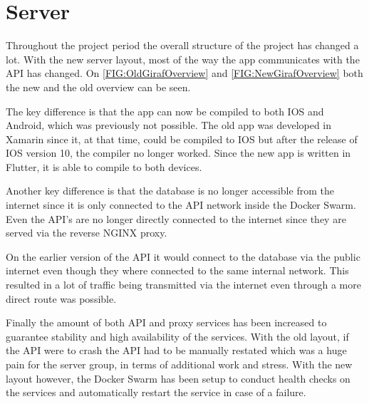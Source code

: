 \section{Server}

Throughout the project period the overall structure of the project has changed a lot. 
With the new server layout, most of the way the app communicates with the API has changed. 
On \autoref{FIG:OldGirafOverview} and \autoref{FIG:NewGirafOverview} both the new and the old overview can be seen. 

The key difference is that the app can now be compiled to both IOS and Android, which was previously not possible. 
The old app was developed in Xamarin since it, at that time, could be compiled to IOS but after the release of IOS version 10, the compiler no longer worked. 
Since the new app is written in Flutter, it is able to compile to both devices. 


Another key difference is that the database is no longer accessible from the internet since it is only connected to the API network inside the Docker Swarm. 
Even the API's are no longer directly connected to the internet since they are served via the reverse NGINX proxy.

On the earlier version of the API it would connect to the database via the public internet even though they where connected to the same internal network.
This resulted in a lot of traffic being transmitted via the internet even through a more direct route was possible. 


Finally the amount of both API and proxy services has been increased to guarantee stability and high availability of the services. 
With the old layout, if the API were to crash the API had to be manually restated which was a huge pain for the server group, in terms of additional work and stress. 
With the new layout however, the Docker Swarm has been setup to conduct health checks on the services and automatically restart the service in case of a failure.

